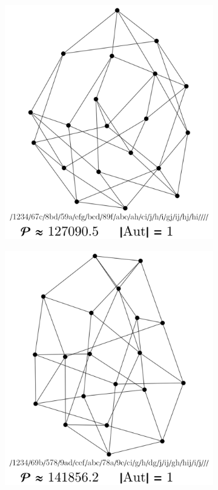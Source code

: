 \documentclass[12pt,a4paper]{article}
\renewcommand{\|}{\rule[-0.4ex]{0.2ex}{1.2em}}
\begin{document}
\begin{figure}[htb]
	\begin{subfigure}[b]{.24 \textwidth}
		\includegraphics[width=\linewidth]{smallest_18_1}
		\subcaption{}
	\end{subfigure}
	\begin{subfigure}[b]{.24 \textwidth}
		\includegraphics[width=\linewidth]{smallest_18_2}

\end{subfigure}
\end{figure}
\end{document}
